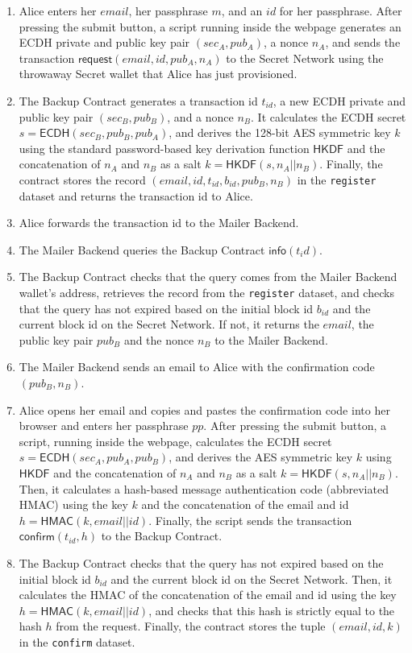 \documentclass[runningheads]{llncs}
\newcommand{\ms}[1]{\ensuremath{\mathsf{#1}}}
\begin{document}
\begin{enumerate} 
\item Alice enters her $email$, her passphrase $m$, and an $id$ for her passphrase. After pressing the submit button, a script running inside the webpage generates an ECDH private and public key pair $(sec_A, pub_A)$, a nonce $n_A$, and sends the transaction $\ms{request}(email, id, pub_A, n_A)$ to the Secret Network using the throwaway Secret wallet that Alice has just provisioned.
\item The Backup Contract generates a transaction id $t_{id}$, a new ECDH private and public key pair $(sec_B, pub_B)$, and a nonce $n_B$. It calculates the ECDH secret $s=\ms{ECDH}(sec_B, pub_B, pub_A)$, and derives the 128-bit AES symmetric key $k$ using the standard password-based key derivation function $\ms{HKDF}$ and the concatenation of $n_A$ and $n_B$ as a salt $k=\ms{HKDF}(s, n_A || n_B)$. Finally, the contract stores the record $(email, id, t_{id}, b_{id}, pub_B, n_B)$ in the {\tt register} dataset and returns the transaction id to Alice.
\item Alice forwards the transaction id to the Mailer Backend. 
\item The Mailer Backend queries the Backup Contract $\ms{info}(t_id)$. 
\item The Backup Contract checks that the query comes from the Mailer Backend wallet's address, retrieves the record from the {\tt register} dataset, and checks that the query has not expired based on the initial block id $b_{id}$ and the current block id on the Secret Network. If not, it returns the $email$, the public key pair $pub_B$ and the nonce $n_B$ to the Mailer Backend. 
\item The Mailer Backend sends an email to Alice with the confirmation code $(pub_B, n_B)$. 
\item Alice opens her email and copies and pastes the confirmation code into her browser and enters her passphrase $pp$. After pressing the submit button, a script, running inside the webpage, calculates the ECDH secret $s=\ms{ECDH}(sec_A, pub_A, pub_B)$, and derives the AES symmetric key $k$ using $\ms{HKDF}$ and the concatenation of $n_A$ and $n_B$ as a salt $k=\ms{HKDF}(s, n_A || n_B)$. Then, it calculates a hash-based message authentication code (abbreviated HMAC) using the key $k$ and the concatenation of the email and id $h=\ms{HMAC}(k, email || id)$. Finally, the script sends the transaction $\ms{confirm}(t_{id}, h)$ to the Backup Contract. 
\item The Backup Contract checks that the query has not expired based on the initial block id $b_{id}$ and the current block id on the Secret Network. Then, it calculates the HMAC of the concatenation of the email and id using the key $h=\ms{HMAC}(k, email || id)$, and checks that this hash is strictly equal to the hash $h$ from the request. Finally, the contract stores the tuple $(email, id, k)$ in the {\tt confirm} dataset.

\end{enumerate}
\end{document}
